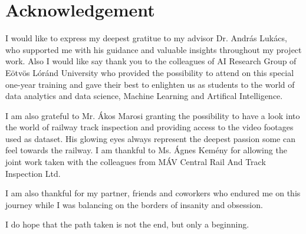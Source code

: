 \section*{Acknowledgement}
I would like to express my deepest gratitue to my advisor Dr. András Lukács,
who supported me with his guidance and valuable insights throughout my project work.
Also I would like say thank you to the colleagues of AI Research Group of Eötvös Lóránd University
who provided the possibility to attend on this special one-year training and gave their best
to enlighten us as students to the world of data analytics and data science, Machine Learning and
Artifical Intelligence.

I am also grateful to Mr. Ákos Marosi granting the possibility to have a
look into the world of railway track inspection and providing access to the video
footages used as dataset.
His glowing eyes always represent the deepest passion some can feel towards the railway.
I am thankful to Ms. Ágnes Kemény for allowing the joint work taken with the colleagues
from MÁV Central Rail And Track Inspection Ltd.

I am also thankful for my partner, friends and coworkers who endured me on this journey while
I was balancing on the borders of insanity and obsession.

I do hope that the path taken is not the end, but only a beginning.
